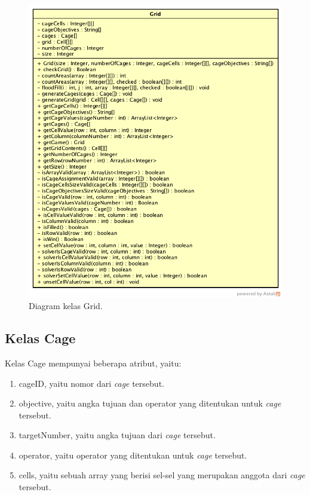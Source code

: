 \begin{figure}
\centering
\captionsetup{justification=centering}
\includegraphics[scale=0.5]{Gambar/Perancangan/DiagramKelasGrid.png}
\caption[Diagram kelas Grid.]{Diagram kelas Grid.}
\label{fig:diagramkelasgrid}
\end{figure}

\subsection{Kelas Cage}
\label{sec:kelascage}

Kelas Cage mempunyai beberapa atribut, yaitu:

\begin{enumerate}
\item cageID, yaitu nomor dari \textit{cage} tersebut.
\item objective, yaitu angka tujuan dan operator yang ditentukan untuk \textit{cage} tersebut.
\item targetNumber, yaitu angka tujuan dari \textit{cage} tersebut.
\item operator, yaitu operator yang ditentukan untuk \textit{cage} tersebut.
\item cells, yaitu sebuah array yang berisi sel-sel yang merupakan anggota dari \textit{cage} tersebut.
\end{enumerate}

